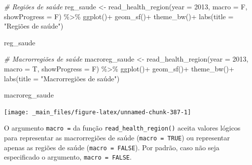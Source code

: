 \documentclass[
  brazilian,
]{book}
\newenvironment{Shaded}{\begin{snugshade}}{\end{snugshade}}
\newcommand{\AttributeTok}[1]{\textcolor[rgb]{0.77,0.63,0.00}{#1}}
\newcommand{\CommentTok}[1]{\textcolor[rgb]{0.56,0.35,0.01}{\textit{#1}}}
\newcommand{\DecValTok}[1]{\textcolor[rgb]{0.00,0.00,0.81}{#1}}
\newcommand{\FunctionTok}[1]{\textcolor[rgb]{0.00,0.00,0.00}{#1}}
\newcommand{\NormalTok}[1]{#1}
\newcommand{\OtherTok}[1]{\textcolor[rgb]{0.56,0.35,0.01}{#1}}
\newcommand{\SpecialCharTok}[1]{\textcolor[rgb]{0.00,0.00,0.00}{#1}}
\newcommand{\StringTok}[1]{\textcolor[rgb]{0.31,0.60,0.02}{#1}}
\begin{document}
\begin{Shaded}
\begin{Highlighting}[]
\CommentTok{\# Regiões de saúde}
\NormalTok{reg\_saude }\OtherTok{\textless{}{-}} \FunctionTok{read\_health\_region}\NormalTok{(}\AttributeTok{year =} \DecValTok{2013}\NormalTok{,}
                                \AttributeTok{macro =}\NormalTok{ F,}
                                \AttributeTok{showProgress =}\NormalTok{ F) }\SpecialCharTok{\%\textgreater{}\%}
  \FunctionTok{ggplot}\NormalTok{()}\SpecialCharTok{+}
  \FunctionTok{geom\_sf}\NormalTok{()}\SpecialCharTok{+}
  \FunctionTok{theme\_bw}\NormalTok{()}\SpecialCharTok{+}
  \FunctionTok{labs}\NormalTok{(}\AttributeTok{title =} \StringTok{"Regiões de saúde"}\NormalTok{)}

\NormalTok{reg\_saude}
\end{Highlighting}
\end{Shaded}

\begin{Shaded}
\begin{Highlighting}[]
\CommentTok{\# Macrorregiões de saúde}
\NormalTok{macroreg\_saude }\OtherTok{\textless{}{-}} \FunctionTok{read\_health\_region}\NormalTok{(}\AttributeTok{year =} \DecValTok{2013}\NormalTok{,}
                                     \AttributeTok{macro =}\NormalTok{ T,}
                                     \AttributeTok{showProgress =}\NormalTok{ F) }\SpecialCharTok{\%\textgreater{}\%}
  \FunctionTok{ggplot}\NormalTok{()}\SpecialCharTok{+}
  \FunctionTok{geom\_sf}\NormalTok{()}\SpecialCharTok{+}
  \FunctionTok{theme\_bw}\NormalTok{()}\SpecialCharTok{+}
  \FunctionTok{labs}\NormalTok{(}\AttributeTok{title =} \StringTok{"Macrorregiões de saúde"}\NormalTok{)}

\NormalTok{macroreg\_saude}
\end{Highlighting}
\end{Shaded}

\begin{center}\texttt{[image: \_main\_files/figure-latex/unnamed-chunk-387-1]} \end{center}

O argumento \texttt{macro\ =} da função \texttt{read\_health\_region()} aceita valores lógicos para representar as macrorregiões de saúde (\texttt{macro\ =\ TRUE}) ou representar apenas as regiões de saúde (\texttt{macro\ =\ FALSE}). Por padrão, caso não seja especificado o argumento, \texttt{macro\ =\ FALSE}.
\end{document}
